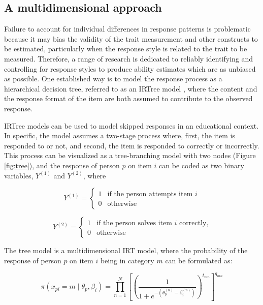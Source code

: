\documentclass[12pt]{article}
\begin{document}
\subsection{A multidimensional approach}
Failure to account for individual differences in response patterns is problematic because it may bias the validity of the trait measurement and other constructs to be estimated,  particularly when the response style is related to the trait to be measured. Therefore, a range of research is dedicated to reliably identifying and controlling for response styles to produce ability estimates which are as unbiased as possible. One established way is to model the response process as a hierarchical decision tree, referred to as an IRTree model \parencite{de2012irtrees}, where the content and the response format of the item are both assumed to contribute to the observed response\parencite{bockenholt2012modeling, de2012irtrees, thissen2013two}.

IRTree models can be used to model skipped responses in an educational context. In specific, the model assumes a two-stage process where, first, the item is responded to or not, and second, the item is responded to correctly or incorrectly. This process can be visualized as a tree-branching model with two nodes (Figure \ref{fig:tree}), and the response of person $p$ on item $i$ can be coded as two binary variables, $Y^{(1)}$ and $Y^{(2)}$, where 

\begin{equation}
Y^{(1)} =
\begin{cases} 
1 & \text{if the person attempts item } i \\
0 & \text{otherwise}
\end{cases}
\end{equation}

\begin{equation}
Y^{(2)} =
\begin{cases} 
1 & \text{if the person solves item } i \text{ correctly,} \\
0 & \text{otherwise}
\end{cases}
\label{eq:cases}
\end{equation}

The tree model is a multidimensional IRT model, where the probability of the response of person $p$ on item $i$ being in category $m$ can be formulated as: 

\begin{equation}
\pi(x_{pi} = m \mid \theta_p, \beta_i) = \prod_{n=1}^{N} \left[ \left( \frac{1}{1 + e^{-(\theta_p^{(n)} - \beta_i^{(n)})}} \right)^{t_{mn}} \right]^{q_{mn}}
\label{eq:tree}
\end{equation}
\end{document}
